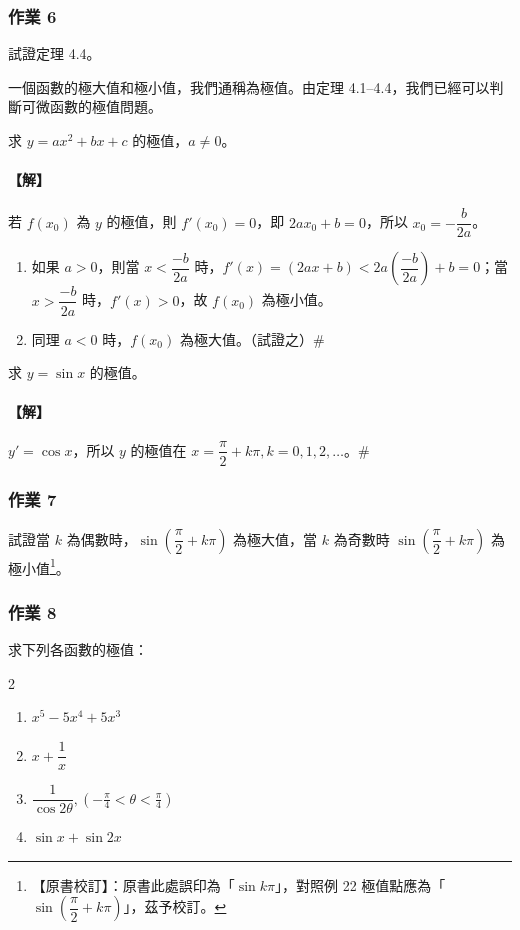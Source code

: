 \subsubsection*{作業 6}
試證定理 4.4。

一個函數的極大值和極小值，我們通稱為極值。由定理 4.1--4.4，我們已經可以判斷可微函數的極值問題。

\begin{example}\label{ex:b6-app4-21}
求 $y=ax^2+bx+c$ 的極值，$a\ne 0$。
\end{example}

\paragraph{【解】}
若 $f(x_0)$ 為 $y$ 的極值，則 $f'(x_0)=0$，即 $2ax_0+b=0$，所以 $x_0 = -\dfrac{b}{2a}$。
\begin{enumerate}[label=\roman*), leftmargin=2em]
  \item 如果 $a>0$，則當 $x<\dfrac{-b}{2a}$ 時，$f'(x)=(2ax+b)<2a\left(\dfrac{-b}{2a}\right)+b=0$；當 $x>\dfrac{-b}{2a}$ 時，$f'(x)>0$，故 $f(x_0)$ 為極小值。
  \item 同理 $a<0$ 時，$f(x_0)$ 為極大值。（試證之）\hfill$\#$
\end{enumerate}

\begin{example}\label{ex:b6-app4-22}
求 $y=\sin x$ 的極值。
\end{example}

\paragraph{【解】}
$y'=\cos x$，所以 $y$ 的極值在 $x = \dfrac{\pi}{2}+k\pi, k=0, 1, 2, \dots$。\hfill$\#$

\subsubsection*{作業 7}
試證當 $k$ 為偶數時，$\sin\left(\dfrac{\pi}{2}+k\pi\right)$ 為極大值，當 $k$ 為奇數時 $\sin\left(\dfrac{\pi}{2}+k\pi\right)$ 為極小值\label{note:b6-app4-p205-sin}\footnote{【原書校訂】：原書此處誤印為「$\sin k\pi$」，對照例 22 極值點應為「$\sin\left(\dfrac{\pi}{2}+k\pi\right)$」，茲予校訂。}。

\subsubsection*{作業 8}
求下列各函數的極值：
\begin{multicols}{2}
\begin{enumerate}[label=\roman*)]
  \item $x^5 - 5x^4 + 5x^3$
  \item $x + \dfrac{1}{x}$
  \item $\dfrac{1}{\cos 2\theta}, \left(-\frac{\pi}{4}<\theta<\frac{\pi}{4}\right)$
  \item $\sin x + \sin 2x$
\end{enumerate}
\end{multicols}

